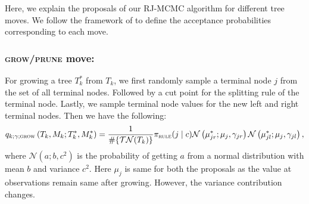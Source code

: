 \documentclass[
12pt]{article}
\begin{document}
Here, we explain the proposals of our RJ-MCMC algorithm for different tree moves. We follow the framework of \cite{green_RJMCMC} to define the acceptance probabilities corresponding to each move.


\subsubsection{\textsc{grow}/\textsc{prune} move:}
For growing a tree $T^{\ast}_k$ from $T_k$, we first randomly sample a terminal node $j$ from the set of all terminal nodes. Followed by a cut point for the splitting rule of the terminal node. Lastly, we sample terminal node values for the new left and right terminal nodes. Then we have the following:
\begin{equation*}
	q_{k;\gamma;\textsc{grow}}\left(T_k,M_k;T_k^{\ast}, M_k^{\ast}\right) 
	= \frac{1}{\#\{\mathcal{TN}(T_k)\}} \pi_{\textsc{rule}}(j\mid c)\mathcal{N}\left(\mu_{jr}^{\ast};\mu_{j},\gamma_{jr}\right)\mathcal{N}\left(\mu_{jl}^{\ast};\mu_{j},\gamma_{jl}\right),
\end{equation*} 
where $\mathcal{N}(a;b,c^2)$ is the probability of getting $a$ from a normal distribution with mean $b$ and variance $c^2$. Here $\mu_j$ is same for both the proposals as the value at observations remain same after growing. However, the variance contribution changes.
\end{document}
